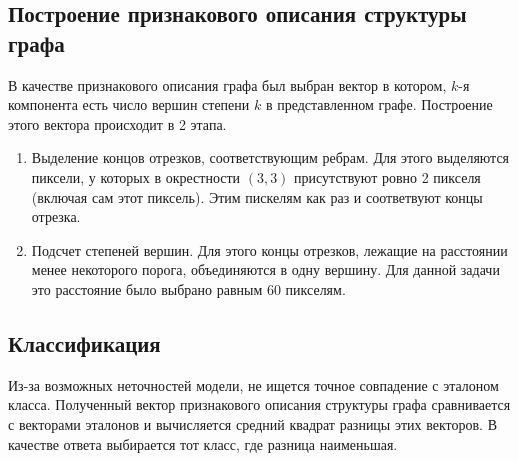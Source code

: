 \documentclass[11pt]{extarticle}
\begin{document}
\subsection{Построение признакового описания структуры графа}
В качестве признакового описания графа был выбран вектор в котором, $k$-я компонента есть число вершин степени $k$ в представленном графе.
Построение этого вектора происходит в 2 этапа.
\begin{enumerate}
  \item Выделение концов отрезков, соответствующим ребрам. Для этого выделяются пиксели, у которых в окрестности $(3, 3)$ присутствуют ровно 2 пикселя (включая сам этот пиксель). Этим пискелям как раз и соответвуют концы отрезка.
  \item Подсчет степеней вершин. Для этого концы отрезков, лежащие на расстоянии менее некоторого порога, объединяются в одну вершину. Для данной задачи это расстояние было выбрано равным 60 пикселям.
\end{enumerate}

\subsection{Классификация}
Из-за возможных неточностей модели, не ищется точное совпадение с эталоном класса. Полученный вектор признакового описания структуры графа сравнивается с векторами эталонов и вычисляется средний квадрат разницы этих векторов. В качестве ответа выбирается тот класс, где разница наименьшая.
\end{document}
